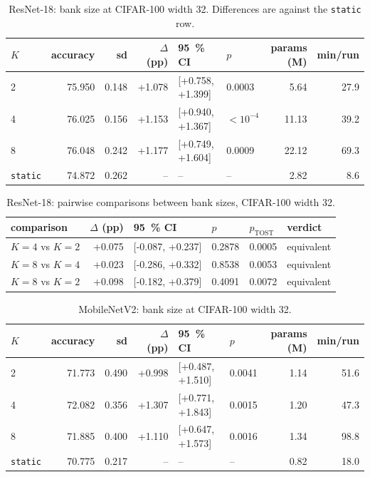 \documentclass[10pt,a4paper]{article}
\begin{document}
\begin{table}[!htbp]\centering\small
\caption{ResNet-18: bank size at CIFAR-100 width 32. Differences are against the
\texttt{static} row.}
\label{tab:k}
\begin{tabular}{l rr rl l rr}
\toprule
$K$ & accuracy & sd & $\Delta$ (pp) & \SI{95}{\percent} CI & $p$ & params (M) & min/run \\
\midrule
2 & 75.950 & 0.148 & +1.078 & [+0.758, +1.399] & 0.0003 & 5.64 & 27.9 \\
4 & 76.025 & 0.156 & +1.153 & [+0.940, +1.367] & $<10^{-4}$ & 11.13 & 39.2 \\
8 & 76.048 & 0.242 & +1.177 & [+0.749, +1.604] & 0.0009 & 22.12 & 69.3 \\
\midrule \texttt{static} & 74.872 & 0.262 & -- & -- & -- & 2.82 & 8.6 \\
\bottomrule
\end{tabular}
\end{table}

\begin{table}[!htbp]\centering\small
\caption{ResNet-18: pairwise comparisons between bank sizes, CIFAR-100
width 32.}
\label{tab:kpairs}
\begin{tabular}{l rl ll l}
\toprule
comparison & $\Delta$ (pp) & \SI{95}{\percent} CI & $p$ & $p_{\text{TOST}}$ & verdict \\
\midrule
$K=4$ vs $K=2$ & +0.075 & [-0.087, +0.237] & 0.2878 & 0.0005 & equivalent \\
$K=8$ vs $K=4$ & +0.023 & [-0.286, +0.332] & 0.8538 & 0.0053 & equivalent \\
$K=8$ vs $K=2$ & +0.098 & [-0.182, +0.379] & 0.4091 & 0.0072 & equivalent \\
\bottomrule
\end{tabular}
\end{table}

\begin{table}[!htbp]\centering\small
\caption{MobileNetV2: bank size at CIFAR-100 width 32.}
\label{tab:mbk}
\begin{tabular}{l rr rl l rr}
\toprule
$K$ & accuracy & sd & $\Delta$ (pp) & \SI{95}{\percent} CI & $p$ & params (M) & min/run \\
\midrule
2 & 71.773 & 0.490 & +0.998 & [+0.487, +1.510] & 0.0041 & 1.14 & 51.6 \\
4 & 72.082 & 0.356 & +1.307 & [+0.771, +1.843] & 0.0015 & 1.20 & 47.3 \\
8 & 71.885 & 0.400 & +1.110 & [+0.647, +1.573] & 0.0016 & 1.34 & 98.8 \\
\midrule \texttt{static} & 70.775 & 0.217 & -- & -- & -- & 0.82 & 18.0 \\
\bottomrule
\end{tabular}
\end{table}
\end{document}

